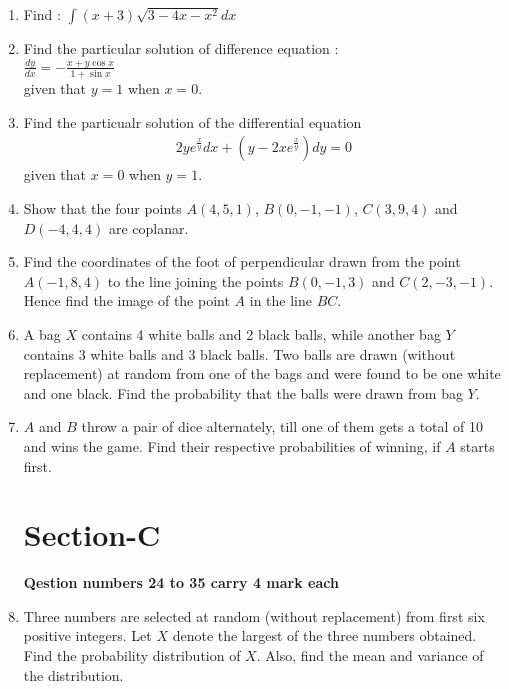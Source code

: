 \documentclass[journal,12pt,onecolumn]{IEEEtran}
\renewcommand\thesection{\arabic{section}}
\begin{document}
\begin{enumerate}[label=\thesection.\arabic*.,ref=\thesection.\theenumi]
\item Find : $\int (x+3)\sqrt{3 - 4x - x^2} dx$\\

\item Find the particular solution of difference equation :\\
 $\frac{dy}{dx} = - \frac{x + y\cos x}{1 + \sin x}$ \\
 given that $y = 1$ when $x = 0$.

\item Find the particualr solution of the differential equation
	\begin{align}
		2y e^{\frac{x}{y}} dx + (y -2x e^{\frac{x}{y}}) dy = 0
	\end{align}
given that $x = 0$ when $y = 1$.

\item Show that the four points $A(4,5,1)$, $ B(0,-1,-1)$, 
$C(3,9,4)$ and $D(-4,4,4)$ are coplanar.

\item Find the coordinates of the foot of perpendicular drawn from the point
$A(-1, 8, 4)$ to the line joining the points $B(0, -1, 3)$ and $C(2,-3,-1)$. Hence
find the image of the point $A$ in the line $BC$.

\item A bag $X$ contains 4 white balls and 2 black balls, while another bag $Y$ contains
3 white balls and 3 black balls. Two balls are drawn (without replacement) at
random from one of the bags and were found to be one white and one black.
Find the probability that the balls were drawn from bag $Y$.

\item $A$ and $B$ throw a pair of dice alternately, till one of them gets a total of 10 and
wins the game. Find their respective probabilities of winning, if $A$ starts first.


\section{Section-C}
\textbf{Qestion numbers 24 to 35 carry 4 mark each}\\

\item Three numbers are selected at random (without replacement) from first six
positive integers. Let $X$ denote the largest of the three numbers obtained. Find
the probability distribution of $X$. Also, find the mean and variance of the
distribution.


\end{enumerate}
\end{document}
